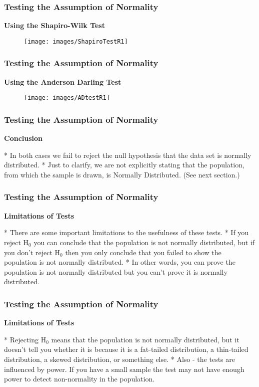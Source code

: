 \frametitle{Testing the Assumption of Normality}

\textbf{Using the Shapiro-Wilk Test}
\begin{figure}
\centering
\texttt{[image: images/ShapiroTestR1]}
\end{figure}


\frametitle{Testing the Assumption of Normality}

\textbf{Using the Anderson Darling Test}
\begin{figure}
\centering
\texttt{[image: images/ADtestR1]}

\end{figure}




\frametitle{Testing the Assumption of Normality}

\textbf{Conclusion}

* In both cases we fail to reject the null hypothesis that the data set is normally distributed.
  *  Just to clarify, we are not explicitly stating that the population, from which the sample is drawn, is Normally Distributed. (See next section.)




\frametitle{Testing the Assumption of Normality}



 
\textbf{Limitations of Tests}

* There are some important limitations to the usefulness of these tests. 
* If you reject H$_0$ you can conclude that the population is not normally distributed, but if you don't reject H$_0$ then you only conclude that you failed to show the population is not normally distributed. 
* In other words, you can prove the population is not normally distributed but you can't prove it is normally distributed. 



\frametitle{Testing the Assumption of Normality}

\textbf{Limitations of Tests}

* Rejecting H$_0$ means that the population is not normally distributed, but it doesn't tell you whether it is because it is a fat-tailed distribution, a thin-tailed distribution, a skewed distribution, or something else.
* Also - the tests are influenced by power. If you have a small sample the test may not have enough power to detect non-normality in the population.


